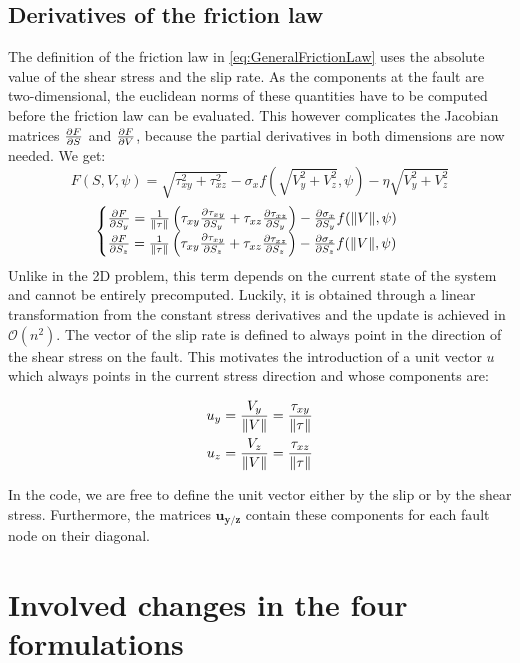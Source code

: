 \subsection{Derivatives of the friction law}
The definition of the friction law in \autoref{eq:GeneralFrictionLaw} uses the absolute value of the shear stress and the slip rate. As the components at the fault are two-dimensional, the euclidean norms of these quantities have to be computed before the friction law can be evaluated. This however complicates the Jacobian matrices $\pdv{F}{S}$ and $\pdv{F}{V}$, because the partial derivatives in both dimensions are now needed. We get:
\begin{equation}
	F(S,V,\psi) = \sqrt{\tau_{xy}^2 + \tau_{xz}^2} - \sigma_xf\left(\sqrt{V_y^2 + V_z^2},\psi\right) - \eta\sqrt{V_y^2 + V_z^2} 
\end{equation}
\begin{align}
	\label{eq:Jacobian_dF_dS_Elasticity3D}
	&\begin{cases}
		\pdv{F}{S_y} = \frac{1}{\norm{\tau}}\left(\tau_{xy}\pdv{\tau_{xy}}{S_y} + \tau_{xz}\pdv{\tau_{xz}}{S_y}\right) - \pdv{\sigma_x}{S_y}f(\norm{V},\psi) \\ 
		\pdv{F}{S_z} = \frac{1}{\norm{\tau}}\left(\tau_{xy}\pdv{\tau_{xy}}{S_z} + \tau_{xz}\pdv{\tau_{xz}}{S_z}\right) - \pdv{\sigma_x}{S_z}f(\norm{V},\psi) 
	\end{cases}
\end{align}
Unlike in the 2D problem, this term depends on the current state of the system and cannot be entirely precomputed. Luckily, it is obtained through a linear transformation from the constant stress derivatives and the update is achieved in $\mathcal{O}\left(n^2\right)$. The vector of the slip rate is defined to always point in the direction of the shear stress on the fault. This motivates the introduction of a unit vector $u$ which always points in the current stress direction and whose components are:

\begin{align}
	u_y &= \frac{V_y}{\norm{V}} = \frac{\tau_{xy}}{\norm{\tau}} \\
	u_z &= \frac{V_z}{\norm{V}} = \frac{\tau_{xz}}{\norm{\tau}}
\end{align}

In the code, we are free to define the unit vector either by the slip or by the shear stress. Furthermore, the matrices $\mathbf{u_{y/z}}$ contain these components for each fault node on their diagonal. 
 
\section{Involved changes in the four formulations}
